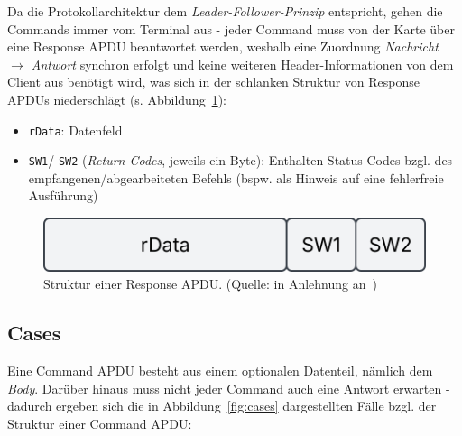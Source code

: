 Da die Protokollarchitektur dem \textit{Leader-Follower-Prinzip} entspricht, gehen die Commands immer vom Terminal aus - jeder Command muss von der Karte über eine Response APDU beantwortet werden, weshalb eine Zuordnung \textit{Nachricht $\rightarrow$ Antwort} synchron erfolgt und keine weiteren Header-Informationen von dem Client aus benötigt wird, was sich in der schlanken Struktur von Response APDUs niederschlägt (s. Abbildung~\ref{fig:rapdu}):

\begin{itemize}
    \itemsep0.5em
    \item \texttt{rData}: Datenfeld
    \item \texttt{SW1}/ \texttt{SW2} (\textit{Return-Codes}, jeweils ein Byte): Enthalten Status-Codes bzgl. des empfangenen/abgearbeiteten Befehls (bspw.  als Hinweis auf eine fehlerfreie Ausführung)
\end{itemize}

\begin{figure}
    \centering
    \includegraphics[scale=0.4]{aufgabe 1/img/rapdu.svg}
    \caption{Struktur einer Response APDU. (Quelle: in Anlehnung an~\cite[\textbf{Abb 2.6}, 24]{ITS5})}
    \label{fig:rapdu}
\end{figure}


\subsection*{Cases}

Eine Command APDU besteht aus einem optionalen Datenteil, nämlich dem \textit{Body}.
Darüber hinaus muss nicht jeder Command auch eine Antwort erwarten - dadurch ergeben sich die in Abbildung~\ref{fig:cases} dargestellten Fälle bzgl. der Struktur einer Command APDU:

